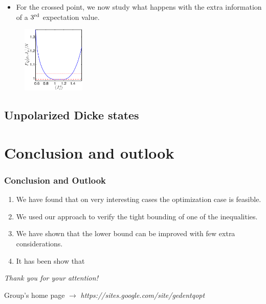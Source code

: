 \documentclass{beamer}
\begin{document}
		\begin{frame}
			\begin{itemize}
				\item For the crossed point, we now study what happens with the extra information of a $3^{\rm rd}$ expectation value.
			\end{itemize}
			\begin{figure}
				\includegraphics[height=120px]{img/4thparameter-spsq.pdf}
			\end{figure}

		\end{frame}

	\subsection{Unpolarized Dicke states}

		\begin{frame}


		\end{frame}

\section{Conclusion and outlook}

	\begin{frame}
		\frametitle{Conclusion and Outlook}
		\begin{enumerate}
			\item<1-> We have found that on very interesting cases the optimization case is feasible.
			\item<2-> We used our approach to verify the tight bounding of one of the inequalities.
			\item<3-> We have shown that the lower bound can be improved with few extra considerations.
			\item<4-> It has been show that
		\end{enumerate}

	\end{frame}

	\begin{frame}
		\emph{\Large Thank you for your attention!}

		\vspace{5px}
		Group's home page $\rightarrow$ \emph{\color{blue} https://sites.google.com/site/gedentqopt}

	\end{frame}
\end{document}
